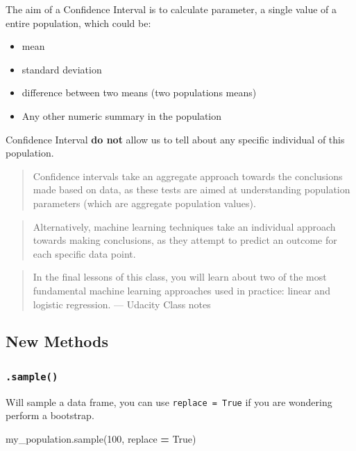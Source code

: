 \documentclass[]{book}
\newenvironment{Shaded}{\begin{snugshade}}{\end{snugshade}}
\newcommand{\DecValTok}[1]{\textcolor[rgb]{0.00,0.00,0.81}{#1}}
\newcommand{\VariableTok}[1]{\textcolor[rgb]{0.00,0.00,0.00}{#1}}
\newcommand{\OperatorTok}[1]{\textcolor[rgb]{0.81,0.36,0.00}{\textbf{#1}}}
\newcommand{\NormalTok}[1]{#1}
\providecommand{\tightlist}{%
  \setlength{\itemsep}{0pt}\setlength{\parskip}{0pt}}
\begin{document}
The aim of a Confidence Interval is to calculate parameter, a single
value of a entire population, which could be:

\begin{itemize}
\tightlist
\item
  mean
\item
  standard deviation
\item
  difference between two means (two populations means)
\item
  Any other numeric summary in the population
\end{itemize}

Confidence Interval \textbf{do not} allow us to tell about any specific
individual of this population.

\begin{quote}
Confidence intervals take an aggregate approach towards the conclusions
made based on data, as these tests are aimed at understanding population
parameters (which are aggregate population values).
\end{quote}

\begin{quote}
Alternatively, machine learning techniques take an individual approach
towards making conclusions, as they attempt to predict an outcome for
each specific data point.
\end{quote}

\begin{quote}
In the final lessons of this class, you will learn about two of the most
fundamental machine learning approaches used in practice: linear and
logistic regression. --- Udacity Class notes
\end{quote}

\subsection{New Methods}\label{new-methods}

\subsubsection{\texorpdfstring{\texttt{.sample()}}{.sample()}}\label{sample}

Will sample a data frame, you can use \texttt{replace\ =\ True} if you
are wondering perform a bootstrap.

\begin{Shaded}
\begin{Highlighting}[]
\NormalTok{my_population.sample(}\DecValTok{100}\NormalTok{, replace }\OperatorTok{=} \VariableTok{True}\NormalTok{)}
\end{Highlighting}
\end{Shaded}
\end{document}
